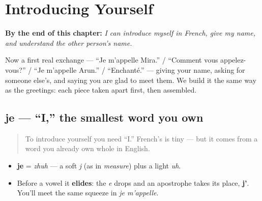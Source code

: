 
\chapter{Introducing Yourself}
\label{ch:introductions}

\begin{chapteropening}
\textbf{By the end of this chapter:} \emph{I can introduce myself in French, give my name, and understand the other person's name.}

Now a first real exchange — “Je m'appelle Mira.” / “Comment vous appelez-vous?” / “Je m'appelle Arun.” / “Enchanté.” — giving your name, asking for someone else's, and saying you are glad to meet them. We build it the same way as the greetings: each piece taken apart first, then assembled.
\end{chapteropening}

\section[je]{je — \textquotedblleft{}I,\textquotedblright{} the smallest word you own}

\label{lesson:FR-C02-je}



\begin{quote}
To introduce yourself you need \textquotedblleft{}I.\textquotedblright{} French's is tiny — but it comes from a word you already own whole in English.
\end{quote}

\begin{sounds}
\begin{itemize}
\raggedright
  \item \textbf{je} = \emph{zhuh} — a soft \emph{j} (as in \emph{measure}) plus a light \emph{uh}.
  \item Before a vowel it \textbf{elides}: the \emph{e} drops and an apostrophe takes its place, \textbf{j'}. You'll meet the same squeeze in \emph{je m'appelle}.
\end{itemize}
\end{sounds}

